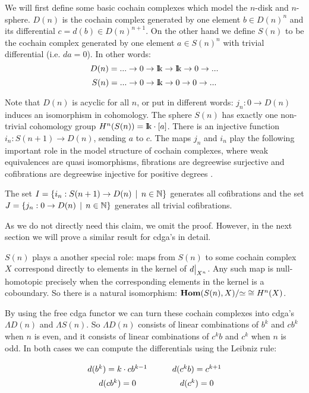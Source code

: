 
We will first define some basic cochain complexes which model the $n$-disk and $n$-sphere. $D(n)$ is the cochain complex generated by one element $b \in D(n)^n$ and its differential $c = d(b) \in D(n)^{n+1}$. On the other hand we define $S(n)$ to be the cochain complex generated by one element $a \in S(n)^n$ with trivial differential (i.e. $d a = 0$). In other words:
$$ D(n) = ... \to 0 \to \mathrm{I\!k} \to \mathrm{I\!k} \to 0 \to ... $$
$$ S(n) = ... \to 0 \to \mathrm{I\!k} \to 0 \to 0 \to ... $$

Note that $D(n)$ is acyclic for all $n$, or put in different words: $j_n : 0 \to D(n)$ induces an isomorphism in cohomology. The sphere $S(n)$ has exactly one non-trivial cohomology group \linebreak $H^n(S(n)) = \mathrm{I\!k} \cdot [a]$. There is an injective function $i_n : S(n+1) \to D(n)$, sending $a$ to $c$. The maps $j_n$ and $i_n$ play the following important role in the model structure of cochain complexes, where weak equivalences are quasi isomorphisms, fibrations are degreewise surjective and cofibrations are degreewise injective for positive degrees \cite[Example 1.6]{goerss2}.

\begin{claim}
	The set $I = \{i_n : S(n+1) \to D(n) \,\mid\, n \in \mathbb{N}\}$ generates all cofibrations and the set $J = \{j_n : 0 \to D(n) \,\mid\, n \in \mathbb{N}\}$ generates all trivial cofibrations.
\end{claim}

As we do not directly need this claim, we omit the proof. However, in the next section we will prove a similar result for cdga's in detail.

$S(n)$ plays a another special role: maps from $S(n)$ to some cochain complex $X$ correspond directly to elements in the kernel of $\restr{d}{X^n}$. Any such map is null-homotopic precisely when the corresponding elements in the kernel is a coboundary. So there is a natural isomorphism: $\mathbf{Hom}(S(n), X) / {\simeq} \cong H^n(X)$.

By using the free cdga functor we can turn these cochain complexes into cdga's $\Lambda D(n)$ and $\Lambda S(n) $. So $\Lambda D(n)$ consists of linear combinations of $b^k$ and $c b^k$ when $n$ is even, and it consists of linear combinations of $c^k b$ and $c^k$ when $n$ is odd. In both cases we can compute the differentials using the Leibniz rule:

\[\xymatrix @R=0cm{
	d(b^k) = k \cdot c b^{k-1}   &   d(c^k b) = c^{k+1}\\
	d(c b^k) = 0   &   d(c^k) = 0
	}
\]

